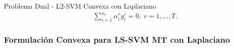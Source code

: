\documentclass[aspectratio=43]{beamer}
\begin{document}
\begin{frame}
\begin{block}{Problema Dual - L2-SVM Convexa con Laplaciano}
\begin{equation}
\begin{aligned}
                       &                       &                                                                                                                                                                                                                                                                                              & \sum_{i=1}^{n_r}{\alpha_i^r y_i^r} = 0, \; r=1,\ldots,T.
                  \end{aligned}
              \end{equation}
      \end{block}
      

\end{frame}

\begin{frame}
      \frametitle{Formulación Convexa para LS-SVM MT con Laplaciano}
  

\end{frame}
\end{document}
